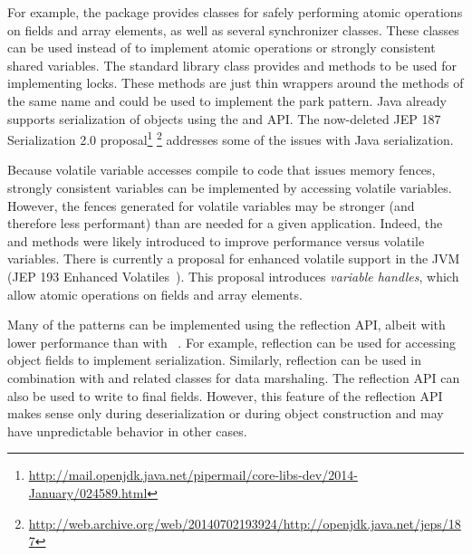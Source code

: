 For example,
the  package provides classes 
for safely performing atomic operations on fields and array elements, as well
as several synchronizer classes. These
classes
can be used instead of \unsafe{} to implement
atomic operations or strongly consistent
shared variables.
The standard library class
 provides
 and 
methods to be used for implementing locks. 
These methods are just thin wrappers
around the \smu{} methods of the same name and 
could be used to implement the park pattern.
Java already supports serialization of objects using the
 and
 API.
The now-deleted JEP 187 Serialization 2.0 proposal\footnote{\url{http://mail.openjdk.java.net/pipermail/core-libs-dev/2014-January/024589.html}}
\footnote{\url{http://web.archive.org/web/20140702193924/http://openjdk.java.net/jeps/187}}
addresses some of the issues with Java serialization.

Because volatile variable accesses compile to code that issues memory fences, 
strongly consistent variables can be implemented by accessing volatile variables.
However, the fences generated for volatile variables may be stronger (and
therefore less performant) than are
needed for a given application. Indeed, the \unsafe{} 
and  methods were likely introduced
to improve performance versus volatile variables. There is currently a proposal
for enhanced volatile support in the JVM
(JEP 193 Enhanced Volatiles~\cite{jep193}).
This proposal introduces \emph{variable handles}, which allow
atomic operations on fields and array elements.

Many of the patterns can be implemented using the reflection API, albeit
with lower performance than with \unsafe{}~\cite{korlandNoninvasiveConcurrencyJava2010}.
For example,
reflection can be used for accessing object fields to implement serialization.
Similarly, reflection can be used
in combination with
 and related classes for
data marshaling.
The reflection API can also be used to write to final fields.
However, this feature of the reflection API 
makes sense only during deserialization or during object construction and may have
unpredictable behavior in other
cases.


